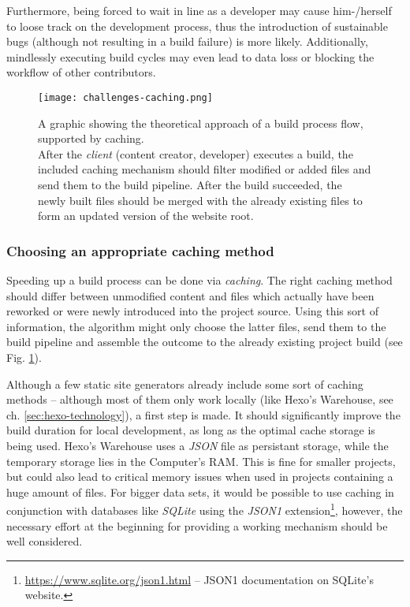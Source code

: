 Furthermore, being forced to wait in line as a developer may cause him-/herself to loose track on the development process, thus the introduction of sustainable bugs (although not resulting in a build failure) is more likely. Additionally, mindlessly executing build cycles may even lead to data loss or blocking the workflow of other contributors.

\begin{figure} %
    \centering
    \texttt{[image: challenges-caching.png]}
    \caption{A graphic showing the theoretical approach of a build process flow, supported by caching.\\
    After the \emph{client} (content creator, developer) executes a build, the included caching mechanism should filter modified or added files and send them to the build pipeline. After the build succeeded, the newly built files should be merged with the already existing files to form an updated version of the website root.}
    \label{fig:caching}
\end{figure}
%

\subsubsection{Choosing an appropriate caching method}
Speeding up a build process can be done via \emph{caching}. The right caching method should differ between unmodified content and files which actually have been reworked or were newly introduced into the project source. Using this sort of information, the algorithm might only choose the latter files, send them to the build pipeline and assemble the outcome to the already existing project build (see Fig. \ref{fig:caching}).

Although a few static site generators already include some sort of caching methods -- although most of them only work locally (like Hexo's Warehouse, see ch. \ref{sec:hexo-technology}), a first step is made. It should significantly improve the build duration for local development, as long as the optimal cache storage is being used. Hexo's Warehouse uses a \emph{JSON} file as persistant storage, while the temporary storage lies in the Computer's RAM. This is fine for smaller projects, but could also lead to critical memory issues when used in projects containing a huge amount of files. For bigger data sets, it would be possible to use caching in conjunction with databases like \emph{SQLite} using the \emph{JSON1} extension\footnote{\url{https://www.sqlite.org/json1.html} -- JSON1 documentation on SQLite's website.}, however, the necessary effort at the beginning for providing a working mechanism should be well considered.

